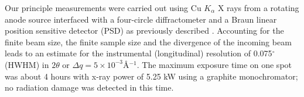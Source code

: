 

Our principle measurements were carried out using Cu $K_{\alpha}$ X rays
from a rotating anode source interfaced with a four-circle diffractometer 
and a Braun linear 
position sensitive detector (PSD) as previously described \cite{Sun94}. 
Accounting for the finite beam size, the finite sample size and the divergence
of the incoming beam leads to an estimate for the instrumental (longitudinal)
resolution
of 0.075$^{\circ}$ (HWHM) in $2 \theta$ or $\Delta q = 5 \times 10^{-3}$\AA$
^{-1}$.  The maximum exposure time on one spot was about 4 hours with x-ray 
power of 5.25 kW using a graphite monochromator; no radiation damage was 
detected in this time.


